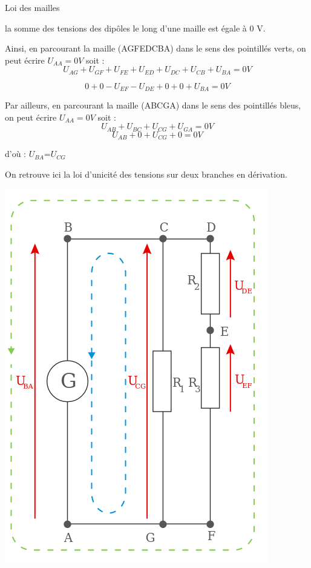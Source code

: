 \documentclass[24pt]{article}
\begin{document}
\begin{concept}{Loi des mailles}
    \begin{minipage}[c]{0.7\textwidth}
        la somme des tensions des dipôles le long d’une maille est égale à 0 V.

        Ainsi, en parcourant la maille (AGFEDCBA) dans le sens des pointillés verts,
        on peut écrire $U_{AA}=0 V$ soit :
        $$U_{AG}+U_{GF}+U_{FE}+U_{ED}+U_{DC}+U_{CB}+U_{BA}=0 V$$

        $$0+0-U_{EF}-U_{DE}+0+0+U_{BA}=0 V$$

        Par ailleurs, en parcourant la maille (ABCGA) dans le sens des pointillés bleus,
        on peut écrire $U_{AA}=0 V$ soit :
        $$U_{AB}+U_{BC}+U_{CG}+U_{GA}=0V$$
        $$U_{AB}+0+U_{CG}+0=0 V$$

        d’où : $U_{BA}$=$U_{CG}$

        On retrouve ici la loi d’unicité des tensions sur deux branches en dérivation.
    \end{minipage}
    \begin{minipage}[c]{0.3\textwidth}
        \begin{center}
            \includegraphics[width=0.8\columnwidth]{c2.png}
        \end{center}
    \end{minipage}
\end{concept}
\end{document}
